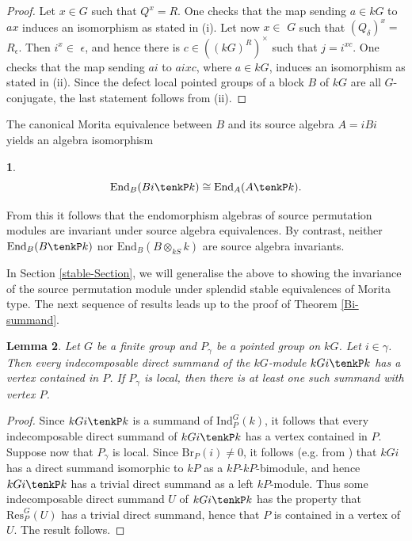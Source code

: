 \documentclass{amsart}
\theoremstyle{plain}\newtheorem{Theorem}{Theorem}[section]
\theoremstyle{plain}\newtheorem{Conjecture}[Theorem]{Conjecture}
\theoremstyle{plain}\newtheorem{Corollary}[Theorem]{Corollary}
\theoremstyle{plain}\newtheorem{Lemma}[Theorem]{Lemma}
\theoremstyle{plain}\newtheorem{Proposition}[Theorem]{Proposition}
\theoremstyle{definition}\newtheorem{Definition}[Theorem]{Definition}
\theoremstyle{definition}\newtheorem{Example}[Theorem]{Example}
\theoremstyle{definition}\newtheorem{Examples}[Theorem]{Examples}
\theoremstyle{definition}\newtheorem{Exercise}[Theorem]{Exercise}
\theoremstyle{definition}\newtheorem{Notation}[Theorem]{Notation}
\theoremstyle{definition}\newtheorem{Remark}[Theorem]{Remark}
\theoremstyle{definition}\newtheorem{Remarks}[Theorem]{Remarks}
\theoremstyle{plain}\newtheorem{Statement}[Theorem]{}
\def\Br{\mathrm{Br}}                 \def\ten{\otimes}
\def\End{\mathrm{End}}
\def\Ind{\mathrm{Ind}}    \def\tenC{\otimes_C}
\def\Res{\mathrm{Res}}           \def\tenOR{\otimes_{\mathcal{O}R}}
\begin{document}
\begin{proof}
Let $x\in G$ such that $Q^x=R$. One checks that the map sending $a\in kG$ to 
$ax$ induces an isomorphism as stated in (i).
Let now $x\in$ $G$ such that $(Q_\delta)^x=$ $R_\epsilon$. Then  $i^x\in$
$\epsilon$, and hence  there is $c\in ((kG)^R)^\times$ such that $j=i^{xc}$. 
One checks that the map sending $ai$ to $aixc$, where $a\in kG$, induces an
isomorphism as stated in (ii). Since the defect local pointed groups of a block
$B$ of $kG$ are all $G$-conjugate, the last statement follows from (ii). 
\end{proof}

The  canonical  Morita equivalence between $B$ and its source  algebra $A=iBi$   
yields   an  algebra   isomorphism
\begin{Statement} \label{EndBi-isom}
$$\End_{B}(Bi\tenkP k) \cong \End_A(A\tenkP k).$$
\end{Statement}
From this it follows that  the endomorphism algebras of  source permutation  
modules are invariant under  source  algebra equivalences. By contrast, 
neither $\End_{B}(B\tenkP k)$ nor $\End_B(B\ten_{kS} k)$ 
are source algebra invariants. 

In  Section \ref{stable-Section},  we will  generalise  the  above   to showing  
the invariance of the source permutation module under splendid stable 
equivalences of    Morita  type.
The  next  sequence of results leads  up to  the proof of Theorem \ref{Bi-summand}.

\begin{Lemma} \label{vertices-Lemma}
Let $G$ be a finite group and $P_\gamma$  be a pointed group on $kG$.
Let $i\in \gamma$. Then every indecomposable direct summand of
the $kG$-module $kGi\tenkP k$ has a vertex contained in $P$. If $P_{\gamma} $  
is  local, then  there is at least one such summand with vertex $P$.
\end{Lemma}

\begin{proof}
Since $kGi\tenkP k$ is a summand of $\Ind^G_P(k)$, it follows that every 
indecomposable direct summand
of $kGi\tenkP k$ has a vertex contained in $P$.  
Suppose now that  $P_{\gamma} $ is local.  Since $\Br_P(i)\neq 0$, it
follows (e.g. from \cite[Lemma 5.8.8]{LiBookI}) 
that $kGi$ has a direct summand isomorphic to $kP$ as a $kP$-$kP$-bimodule,
and hence $kGi\tenkP k$ has a trivial direct summand as a left $kP$-module.
Thus some indecomposable direct summand $U$ of $kGi\tenkP k$ has  the
property that $\Res^G_P(U)$ has a trivial direct summand, hence that $P$ is
contained in a vertex of $U$. The result follows.
\end{proof}
\end{document}
